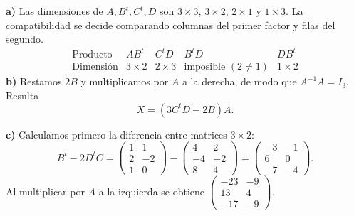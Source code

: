 \textbf{a)} Las dimensiones de $A,B^t,C^t,D$ son
$3\times3$, $3\times2$, $2\times1$ y $1\times3$.
La compatibilidad se decide comparando columnas del primer
factor y filas del segundo.
\[
\begin{array}{c|cccc}
\text{Producto}&AB^t&C^tD&B^tD&DB^t\\\hline
\text{Dimensión}&3\times2&2\times3&\text{imposible }(2\ne1)&1\times2
\end{array}
\]
\textbf{b)} Restamos $2B$ y multiplicamos por $A$ a la derecha,
de modo que $A^{-1}A=I_3$. Resulta
\[
\boxed{X=(3C^tD-2B)A}.
\]

\textbf{c)} Calculamos primero la diferencia entre matrices $3\times2$:
\[
B^t-2D^tC=
\begin{pmatrix}1&1\\2&-2\\1&0\end{pmatrix}
-\begin{pmatrix}4&2\\-4&-2\\8&4\end{pmatrix}
=\begin{pmatrix}-3&-1\\6&0\\-7&-4\end{pmatrix}.
\]
Al multiplicar por $A$ a la izquierda se obtiene
$\boxed{\begin{pmatrix}-23&-9\\13&4\\-17&-9\end{pmatrix}}$.
